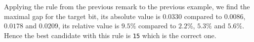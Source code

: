 	Applying the rule from the previous remark to the previous example, we find the maximal gap for the  target bit, its absolute value is $0.0330$ compared to $0.0086$, $0.0178$ and $0.0209$, its relative value is $9.5\%$ compared to $2.2\%$, $5.3\%$ and $5.6\%$. Hence the best candidate with this rule is {\tt 15} which is the correct one.
	
